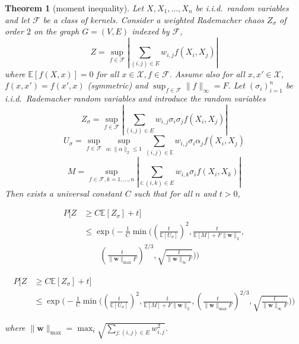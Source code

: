 \documentclass[letterpaper]{article} %
\def\DoubleColumn{}
\def\DoubleColumnEnd{}
\def\SingleColumn{}
\def\SingleColumnEnd{}
\newtheorem{theorem}{Theorem}
\newcommand{\E}{\mathbb{E}}
\newcommand{\Pro}{P}
\newcommand{\weight}{\mathbf{w}}
\newcommand{\xspace}{\mathcal{X}}
\newcommand{\rademacher}{\sigma}
\newcommand{\pair}[1]{(#1)}
\begin{document}
\begin{theorem}[moment inequality]
    \label{th:moment_inequality_of_weighted_u_statistics}
    Let $X, X_1,\dots,X_n$ be i.i.d.\ random variables and let $\mathcal F$ be a class of kernels. Consider a weighted Rademacher chaos $Z_\rademacher{}$ of order $2$ on the graph $G=(V,E)$ indexed by $\mathcal F$,
    \[Z = \sup_{f\in\mathcal F}|\sum_{\pair{i,j}\in E}w_{i,j}f(X_i,X_j)|\]
    where $\E[f(X,x)]=0$ for all $x\in\xspace{},f\in\mathcal{F}$. Assume also for all $x,x'\in\xspace$, $f(x,x')=f(x',x)$ (symmetric) and $\sup_{f\in\mathcal F}\|f\|_\infty=F$. Let $(\rademacher{}_i)_{i=1}^n$ be i.i.d.\ Rademacher random variables and introduce the random variables
    \[Z_\rademacher = \sup_{f\in\mathcal F}|\sum_{\pair{i,j}\in E}w_{i,j}\rademacher_i\rademacher_jf(X_i,X_j)|\]
    \[U_\rademacher = \sup_{f\in\mathcal F}\sup_{\alpha:\|\alpha\|_2\le 1}\sum_{\pair{i,j}\in\E}w_{i,j}\rademacher_i\alpha_jf(X_i,X_j)\]
    \[M=\sup_{f\in\mathcal F,k=1,\dots,n}|\sum_{i:(i,k)\in E}w_{i,k}\rademacher_if(X_i,X_k)|\]
    Then exists a universal constant $C$ such that for all $n$ and $t>0$,
    \DoubleColumn
    \begin{align*}
        \Pro[Z&\ge C\E[Z_\rademacher]+t]\\
        &\le \exp\Bigg(-\frac{1}{C}\min\Big((\frac{t}{\E[U_\rademacher]})^2,\frac{t}{\E[M]+F\|\weight{}\|_2},\\
        &\qquad(\frac{t}{\|\weight{}\|_{\max}F})^{2/3},\sqrt{\frac{t}{\|\weight{}\|_\infty F}}\Big)\Bigg)
    \end{align*}
    \DoubleColumnEnd
    \SingleColumn
    \begin{align*}
        \Pro[Z&\ge C\E[Z_\rademacher]+t]\\
        &\le \exp\Bigg(-\frac{1}{C}\min\Big((\frac{t}{\E[U_\rademacher]})^2,\frac{t}{\E[M]+F\|\weight{}\|_2},(\frac{t}{\|\weight{}\|_{\max}F})^{2/3},\sqrt{\frac{t}{\|\weight{}\|_\infty F}}\Big)\Bigg)
    \end{align*}
    \SingleColumnEnd
    where $\|\weight{}\|_{\max}=\max_i \sqrt{\sum_{j:\pair{i,j}\in E} w_{i,j}^2}$.
\end{theorem}
\end{document}
